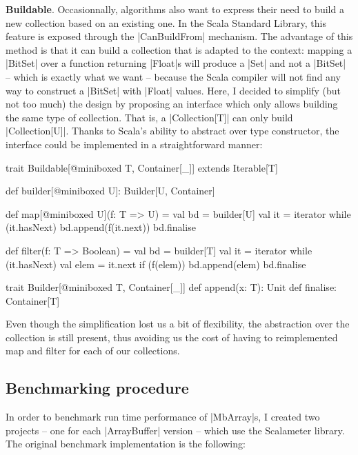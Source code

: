 \textbf{Buildable}. Occasionnally, algorithms also want to express their need to build a new collection based on an existing one. In the Scala Standard Library, this feature is exposed through the |CanBuildFrom| mechanism. The advantage of this method is that it can build a collection that is adapted to the context: mapping a |BitSet| over a function returning |Float|s will produce a |Set| and not a |BitSet| -- which is exactly what we want -- because the Scala compiler will not find any way to construct a |BitSet| with |Float| values. Here, I decided to simplify (but not too much) the design by proposing an interface which only allows building the same type of collection. That is, a |Collection[T]| can only build |Collection[U]|. Thanks to Scala's ability to abstract over type constructor, the interface could be implemented in a straightforward manner: 

\begin{lstlisting-nobreak}
trait Buildable[@miniboxed T, Container[_]] extends Iterable[T] {
  def builder[@miniboxed U]: Builder[U, Container]

  def map[@miniboxed U](f: T => U) = {
    val bd = builder[U]
    val it = iterator
    while (it.hasNext) {
      bd.append(f(it.next))
    }
    bd.finalise
  }

  def filter(f: T => Boolean) = {
    val bd = builder[T]
    val it = iterator
    while (it.hasNext) {
      val elem = it.next
      if (f(elem)) {
        bd.append(elem)
      }
    }
    bd.finalise
  }
}

trait Builder[@miniboxed T, Container[_]] {
  def append(x: T): Unit
  def finalise: Container[T]
}
\end{lstlisting-nobreak}

Even though the simplification lost us a bit of flexibility, the abstraction over the collection is still present, thus avoiding us the cost of having to reimplemented map and filter for each of our collections.

\subsection{Benchmarking procedure}

In order to benchmark run time performance of |MbArray|s, I created two projects -- one for each |ArrayBuffer| version -- which use the Scalameter library. The original benchmark implementation is the following:

